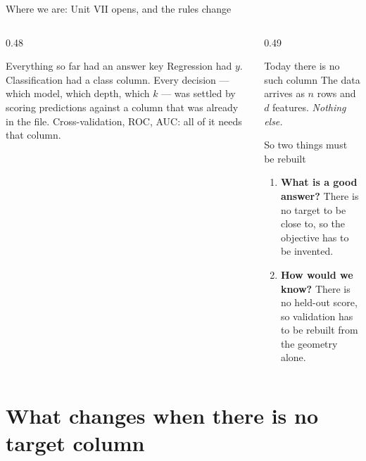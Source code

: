 \documentclass[aspectratio=169]{beamer}
\begin{document}
\begin{frame}[shrink=5]{Where we are: Unit VII opens, and the rules change}
  \begin{columns}[T]
    \begin{column}{0.48\textwidth}
      \begin{block}{Everything so far had an answer key}
        Regression had $y$. Classification had a class column. Every
        decision --- which model, which depth, which $k$ --- was settled by
        scoring predictions against a column that was already in the file.
        Cross-validation, ROC, AUC: all of it needs that column.
      \end{block}
    \end{column}
    \begin{column}{0.49\textwidth}
      \begin{exampleblock}{Today there is no such column}
        \centering\large
        The data arrives as $n$ rows and $d$ features. \emph{Nothing else.}
      \end{exampleblock}
      \begin{alertblock}{So two things must be rebuilt}
        \begin{enumerate}
          \item \textbf{What is a good answer?} There is no target to be
            close to, so the objective has to be invented.
          \item \textbf{How would we know?} There is no held-out score, so
            validation has to be rebuilt from the geometry alone.
        \end{enumerate}
      \end{alertblock}
    \end{column}
  \end{columns}
\end{frame}

\section[No target]{What changes when there is no target column}
\label{sec:why}
\end{document}
